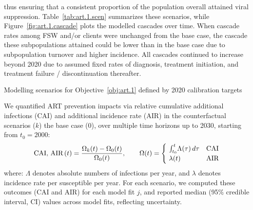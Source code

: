 thus ensuring that a consistent proportion of the population overall
attained viral suppression.
Table~\ref{tab:art.1.scen} summarizes these scenarios, while
Figure~\ref{fig:art.1.cascade} plots the modelled cascades over time.
When cascade rates among FSW and/or clients were unchanged from the base case,
the cascade these subpopulations attained could be lower than in the base case
due to subpopulation turnover and higher incidence.
All cascades continued to increase beyond 2020 due to assumed fixed rates of
diagnosis, treatment initiation, and treatment failure / discontinuation thereafter.
\begin{table}
  \centering
  \caption{Modelling scenarios for Objective~\ref{obj:art.1} defined by 2020 calibration targets}
  \label{tab:art.1.scen}
  
\end{table}
\par
We quantified ART prevention impacts via relative
cumulative additional infections (CAI) and additional incidence rate (AIR)
in the counterfactual scenarios ($k$) \vs the base case ($0$),
over multiple time horizons up to 2030, starting from $t_0 = 2000$:
\begin{equation}
  \textnormal{CAI, AIR}\,(t) = \frac{\Omega_{k}(t) - \Omega_{0}(t)}{\Omega_{0}(t)}
  ,\qquad \Omega(t) =
  \begin{cases}
    ~\int_{t_0}^{t}\!\Lambda(\tau)\,d\tau & \textnormal{CAI} \\
    ~\lambda(t) & \textnormal{AIR}
  \end{cases}
\end{equation} where:
$\Lambda$ denotes absolute numbers of infections per year, and
$\lambda$ denotes incidence rate per susceptible per year.
For each scenario, we computed these outcomes (CAI and AIR) for each model fit $j$,
and reported median (95\% credible interval, CI) values across model fits, reflecting uncertainty.
